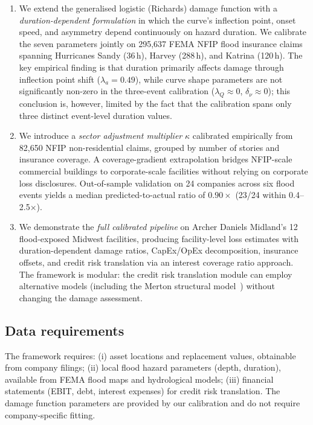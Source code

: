 \begin{enumerate}
    \item We extend the generalised logistic (Richards) damage function with a \textit{duration-dependent formulation} in which the curve's inflection point, onset speed, and asymmetry depend continuously on hazard duration. We calibrate the seven parameters jointly on 295{,}637 FEMA NFIP flood insurance claims spanning Hurricanes Sandy (36\,h), Harvey (288\,h), and Katrina (120\,h). The key empirical finding is that duration primarily affects damage through inflection point shift ($\lambda_a = 0.49$), while curve shape parameters are not significantly non-zero in the three-event calibration ($\lambda_Q \approx 0$, $\delta_\nu \approx 0$); this conclusion is, however, limited by the fact that the calibration spans only three distinct event-level duration values.

    \item We introduce a \textit{sector adjustment multiplier} $\kappa$ calibrated empirically from 82{,}650 NFIP non-residential claims, grouped by number of stories and insurance coverage. A coverage-gradient extrapolation bridges NFIP-scale commercial buildings to corporate-scale facilities without relying on corporate loss disclosures. Out-of-sample validation on 24 companies across six flood events yields a median predicted-to-actual ratio of $0.90\times$ (23/24 within 0.4--2.5$\times$).

    \item We demonstrate the \textit{full calibrated pipeline} on Archer Daniels Midland's 12 flood-exposed Midwest facilities, producing facility-level loss estimates with duration-dependent damage ratios, CapEx/OpEx decomposition, insurance offsets, and credit risk translation via an interest coverage ratio approach. The framework is modular: the credit risk translation module can employ alternative models (including the Merton structural model~\cite{merton1974pricing}) without changing the damage assessment.
\end{enumerate}

\subsection{Data requirements}

The framework requires: (i) asset locations and replacement values, obtainable from company filings; (ii) local flood hazard parameters (depth, duration), available from FEMA flood maps and hydrological models; (iii) financial statements (EBIT, debt, interest expenses) for credit risk translation. The damage function parameters are provided by our calibration and do not require company-specific fitting.

